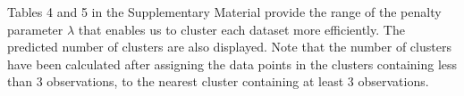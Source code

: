 \documentclass[12pt]{article}
\begin{document}
Tables 4 and 5 in the Supplementary Material provide the range of the penalty parameter $\lambda$ that enables us to cluster each dataset more efficiently. The predicted number of clusters are also displayed. Note that the number of clusters have been calculated after assigning the data points in the clusters containing less than $3$ observations, to the nearest cluster containing at least $3$ observations. 

\end{document}
